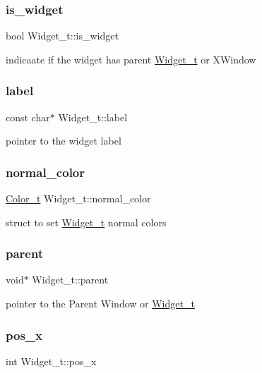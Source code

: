 \subsubsection{\texorpdfstring{is\+\_\+widget}{is\_widget}}
{\footnotesize\ttfamily bool Widget\+\_\+t\+::is\+\_\+widget}

indicaate if the widget has parent \hyperlink{structWidget__t}{Widget\+\_\+t} or X\+Window \mbox{\label{structWidget__t_a952020107ac1f6d9a37b4f978f77b61c}} 
\subsubsection{\texorpdfstring{label}{label}}
{\footnotesize\ttfamily const char$\ast$ Widget\+\_\+t\+::label}

pointer to the widget label \mbox{\label{structWidget__t_a24f7c236de2f1083b37318d0552c8e3a}} 
\subsubsection{\texorpdfstring{normal\+\_\+color}{normal\_color}}
{\footnotesize\ttfamily \hyperlink{structColor__t}{Color\+\_\+t} Widget\+\_\+t\+::normal\+\_\+color}

struct to set \hyperlink{structWidget__t}{Widget\+\_\+t} normal colors \mbox{\label{structWidget__t_a483f6517c19fe09e1bf2eaec6646a14b}} 
\subsubsection{\texorpdfstring{parent}{parent}}
{\footnotesize\ttfamily void$\ast$ Widget\+\_\+t\+::parent}

pointer to the Parent Window or \hyperlink{structWidget__t}{Widget\+\_\+t} \mbox{\label{structWidget__t_ae2d46ffb30bb2335a043d138fa05e1a3}} 
\subsubsection{\texorpdfstring{pos\+\_\+x}{pos\_x}}
{\footnotesize\ttfamily int Widget\+\_\+t\+::pos\+\_\+x}

